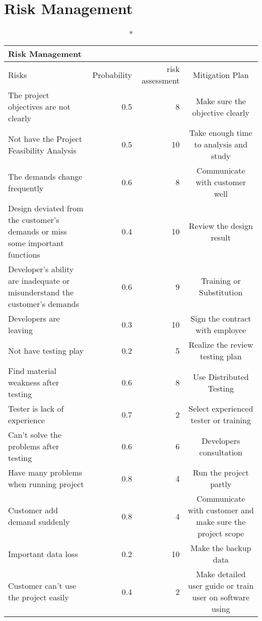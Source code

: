 \documentclass[a4paper,11pt]{article}
\begin{document}
\section{Risk Management}
\begin{center}
\begin{longtable}{|L|r|r|S|}
\caption*{Risk Management} \\
\hline Risks                                     & Probability & risk assessment & Mitigation Plan \\
\hline The project objectives are not clearly    & 0.5         & 8               & Make sure the objective clearly \\
\hline Not have the Project Feasibility Analysis & 0.5         & 10              & Take enough time to analysis and study \\
\hline The demands change frequently             & 0.6         & 8               & Communicate with customer well \\
\hline Design deviated from the customer's 
demands or miss some important functions         & 0.4         & 10              & Review the design result \\
\hline Developer's ability are inadequate or 
misunderstand the customer's demands             & 0.6         & 9               & Training or Substitution \\
\hline Developers are leaving                    & 0.3         & 10              & Sign  the contract  with employee \\
\hline Not have testing play                     & 0.2         & 5               & Realize the review testing plan \\
\hline Find material weakness after testing      & 0.6         & 8               & Use Distributed Testing \\
\hline Tester is lack of experience              & 0.7         & 2               & Select experienced tester or training \\
\hline Can't solve the problems after testing    & 0.6         & 6               & Developers consultation \\
\hline Have many problems when running project   & 0.8         & 4               & Run the project partly \\
\hline Customer add demand suddenly              & 0.8         & 4               & Communicate with customer and make sure the project scope \\
\hline Important data loss                       & 0.2         & 10              & Make the backup data \\
\hline Customer can't use the project easily     & 0.4         & 2               & Make detailed user guide or train user on software using \\
\hline 
\end{longtable}
\end{center}
\end{document}
